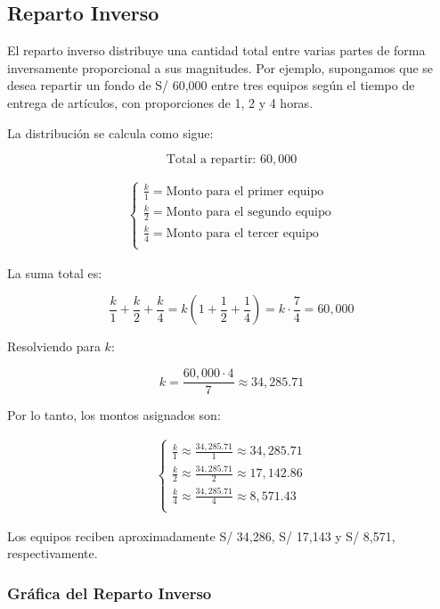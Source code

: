 \documentclass[
  stu,
  floatsintext,
  longtable,
  a4paper,
  nolmodern,
  notxfonts,
  notimes,
  colorlinks=true,linkcolor=blue,citecolor=blue,urlcolor=blue]{apa7}
\begin{document}
\subsection{Reparto Inverso}\label{reparto-inverso}

El reparto inverso distribuye una cantidad total entre varias partes de
forma inversamente proporcional a sus magnitudes. Por ejemplo,
supongamos que se desea repartir un fondo de S/ 60,000 entre tres
equipos según el tiempo de entrega de artículos, con proporciones de 1,
2 y 4 horas.

La distribución se calcula como sigue:

\[
\text{Total a repartir: } 60,000
\]

\begin{align*}
\begin{cases}
\frac{k}{1} = \text{Monto para el primer equipo} \\
\frac{k}{2} = \text{Monto para el segundo equipo} \\
\frac{k}{4} = \text{Monto para el tercer equipo} \\
\end{cases}
\end{align*}

La suma total es:

\[
\frac{k}{1} + \frac{k}{2} + \frac{k}{4} = k \left(1 + \frac{1}{2} + \frac{1}{4}\right) = k \cdot \frac{7}{4} = 60,000
\]

Resolviendo para \(k\):

\[
k = \frac{60,000 \cdot 4}{7} \approx 34,285.71
\]

Por lo tanto, los montos asignados son:

\begin{align*}
\begin{cases}
\frac{k}{1} \approx \frac{34,285.71}{1} \approx 34,285.71 \\
\frac{k}{2} \approx \frac{34,285.71}{2} \approx 17,142.86 \\
\frac{k}{4} \approx \frac{34,285.71}{4} \approx 8,571.43 \\
\end{cases}
\end{align*}

Los equipos reciben aproximadamente S/ 34,286, S/ 17,143 y S/ 8,571,
respectivamente.

\subsubsection{Gráfica del Reparto
Inverso}\label{gruxe1fica-del-reparto-inverso}
\end{document}
